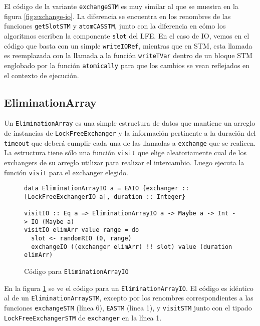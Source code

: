 El código de la variante \texttt{exchangeSTM} es muy similar al que se muestra en la figura \ref{fig:exchange-io}. La diferencia se encuentra en los renombres de las funciones \texttt{getSlotSTM} y \texttt{atomCASSTM}, junto con la diferencia en cómo los algoritmos escriben la componente \texttt{slot} del LFE. En el caso de IO, vemos en el código que basta con un simple \texttt{writeIORef}, mientras que en STM, esta llamada es reemplazada con la llamada a la función \texttt{writeTVar} dentro de un bloque STM englobado por la función \texttt{atomically} para que los cambios se vean reflejados en el contexto de ejecución.

\subsection{EliminationArray}
Un \texttt{EliminationArray} es una simple estructura de datos que mantiene un arreglo de instancias de \texttt{LockFreeExchanger} y la información pertinente a la duración del \texttt{timeout} que deberá cumplir cada una de las llamadas a \texttt{exchange} que se realicen.
La estructura tiene sólo una función \texttt{visit} que elige aleatoriamente cual de los exchangers de su arreglo utilizar para realizar el intercambio. Luego ejecuta la función \texttt{visit} para el exchanger elegido.

\begin{figure}[H]
  \centering
  \begin{verbatim}
data EliminationArrayIO a = EAIO {exchanger :: [LockFreeExchangerIO a], duration :: Integer}

visitIO :: Eq a => EliminationArrayIO a -> Maybe a -> Int -> IO (Maybe a)
visitIO elimArr value range = do
  slot <- randomRIO (0, range)
  exchangeIO ((exchanger elimArr) !! slot) value (duration elimArr)
  \end{verbatim}
  \caption{Código para \texttt{EliminationArrayIO}}
  \label{fig:elimArr}
\end{figure}

En la figura \ref{fig:elimArr} se ve el código para un \texttt{EliminationArrayIO}. El código es idéntico al de un \texttt{EliminationArraySTM}, excepto por los renombres correspondientes a las funciones \texttt{exchangeSTM} (línea 6), \texttt{EASTM} (línea 1), y \texttt{visitSTM} junto con el tipado \texttt{LockFreeExchangerSTM} de \texttt{exchanger} en la línea 1.


